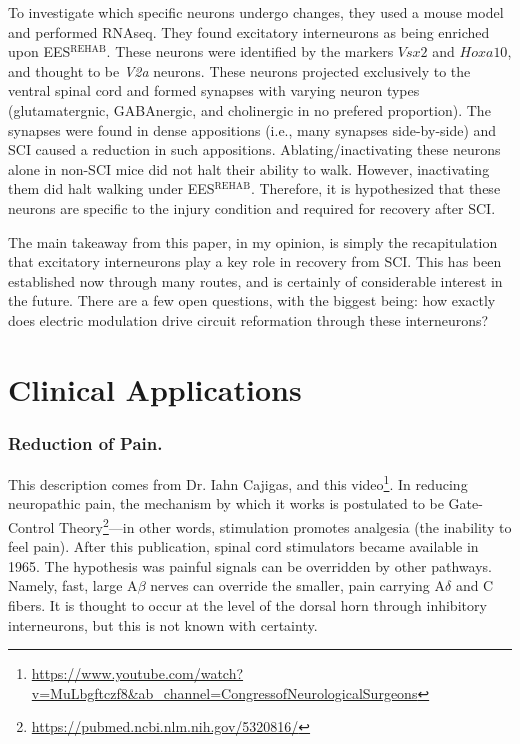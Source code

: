 To investigate which specific neurons undergo changes, they used a mouse model and performed RNAseq. They found excitatory interneurons as being enriched upon EES$^{\mathrm{REHAB}}$. These neurons were identified by the markers $Vsx2$ and $Hoxa10$, and thought to be \textit{V2a} neurons. These neurons projected exclusively to the ventral spinal cord and formed synapses with varying neuron types (glutamatergnic, GABAnergic, and cholinergic in no prefered proportion). The synapses were found in dense appositions (i.e., many synapses side-by-side) and SCI caused a reduction in such appositions. Ablating/inactivating these neurons alone in non-SCI mice did not halt their ability to walk. However, inactivating them did halt walking under EES$^{\mathrm{REHAB}}$. Therefore, it is hypothesized that these neurons are specific to the injury condition and required for recovery after SCI.\newline

The main takeaway from this paper, in my opinion, is simply the recapitulation that excitatory interneurons play a key role in recovery from SCI. This has been established now through many routes, and is certainly of considerable interest in the future. There are a few open questions, with the biggest being: how exactly does electric modulation drive circuit reformation through these interneurons? 

\section{Clinical Applications}

\subsubsection{Reduction of Pain.}
This description comes from Dr. Iahn Cajigas, and this video\footnote{\url{https://www.youtube.com/watch?v=MuLbgftczf8\&ab_channel=CongressofNeurologicalSurgeons}}. In reducing neuropathic pain, the mechanism by which it works is postulated to be Gate-Control Theory\footnote{\url{https://pubmed.ncbi.nlm.nih.gov/5320816/}}---in other words, stimulation promotes analgesia (the inability to feel pain). After this publication, spinal cord stimulators became available in 1965. The hypothesis was painful signals can be overridden by other pathways. Namely, fast, large A$\beta$ nerves can override the smaller, pain carrying A$\delta$ and C fibers. It is thought to occur at the level of the dorsal horn through inhibitory interneurons, but this is not known with certainty.\newline

